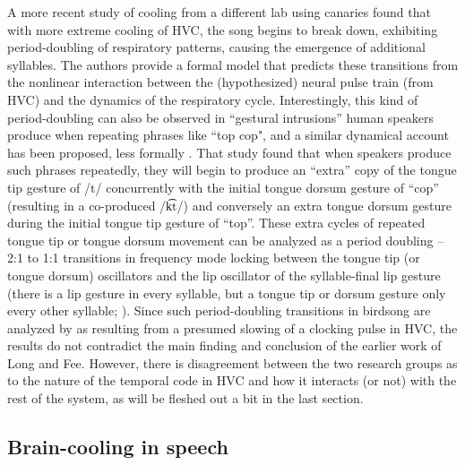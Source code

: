 \documentclass[output=paper,
modfonts
]{LSP/langsci}
\begin{document}
A more recent study of cooling from a different lab using canaries \citep{Goldin2013} found that with more extreme cooling of HVC, the song begins to break down, exhibiting period-doubling of respiratory patterns, causing the emergence of additional syllables. The authors provide a formal model that predicts these transitions from the nonlinear interaction between the (hypothesized) neural pulse train (from HVC) and the dynamics of the respiratory cycle. Interestingly, this kind of period-doubling can also be observed in ``gestural intrusions'' human speakers produce when repeating phrases like ``top cop", and a similar dynamical account has been proposed, less formally \citep{Goldstein2007}.  That study found that when speakers produce such phrases repeatedly, they will begin to produce an ``extra'' copy of the tongue tip gesture of /t/ concurrently with the
initial tongue dorsum gesture of ``cop'' (resulting in a co-produced /k͡t/) and conversely an extra tongue dorsum gesture during the initial tongue tip gesture of ``top''. These extra cycles of repeated tongue tip or tongue dorsum movement can be analyzed as a period doubling -- 2:1 to 1:1 transitions in frequency mode locking between the tongue tip (or tongue dorsum) oscillators and the lip oscillator of the syllable-final lip gesture (there is a lip gesture in every syllable, but a tongue tip or dorsum gesture only every other syllable; \citealt{Goldstein2007}).
Since such period-doubling transitions in birdsong are analyzed by \citet{Goldin2013}  as resulting from a presumed slowing of a clocking pulse in HVC, the results do not contradict the main finding and conclusion of the earlier work of Long and Fee. However, there is disagreement between the two research groups as to the nature of the temporal code in HVC and how it interacts (or not) with the rest of the system, as will be fleshed out a bit in the last section.

\subsection{Brain-cooling in speech}
\end{document}
